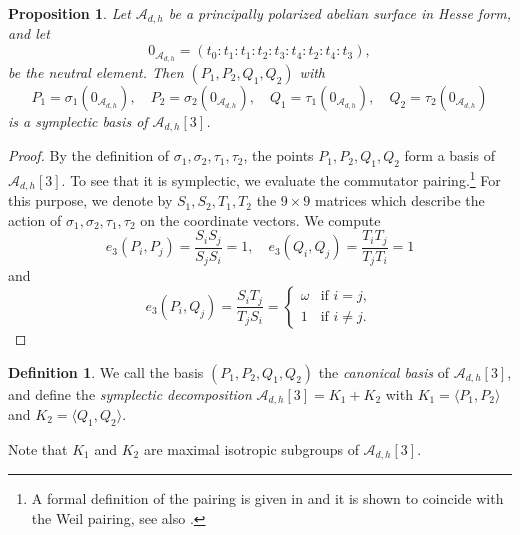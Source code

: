 \documentclass[11pt]{amsart}
\newtheorem{proposition}[theorem]{Proposition}
\theoremstyle{definition}
\newtheorem{definition}[theorem]{Definition}
\newcommand{\A}{\mathcal{A}}
\begin{document}
\begin{proposition} \label{prop:3-torsion}
	Let $\A_{d,h}$ be a principally polarized abelian surface in Hesse form, and let
    \[
    0_{\A_{d,h}} = (t_0 : t_1 : t_1 : t_2 : t_3: t_4 : t_2 : t_4 : t_3),
    \] be the neutral element. Then $(P_1,P_2,Q_1,Q_2)$ with
    \[
    P_1 = \sigma_1(0_{\A_{d,h}}),\quad P_2 = \sigma_2(0_{\A_{d,h}}), \quad Q_1 = \tau_1(0_{\A_{d,h}}),\quad Q_2 = \tau_2(0_{\A_{d,h}})
    \]
	is a symplectic basis of $\A_{d,h}[3]$. 
\end{proposition}

\begin{proof}
	By the definition of $\sigma_1,\sigma_2,\tau_1,\tau_2$, the points $P_1,P_2,Q_1,Q_2$ form a basis of  $\A_{d,h}[3]$.  To see that it is  symplectic, we evaluate the commutator pairing.\footnote{A formal definition of the pairing is given in \cite[p.227]{mumford-book} and it is shown to coincide with the Weil pairing, see also \cite[Section 6.1]{lubicz2012computing}.} For this purpose, we denote by $S_1,S_2,T_1,T_2$ the $9\times 9$ matrices which describe the action of $\sigma_1,\sigma_2,\tau_1,\tau_2$ on the coordinate vectors. We compute
	\[
	e_3(P_i,P_j) = \frac{S_iS_j}{S_jS_i} = 1, \quad e_3(Q_i,Q_j) = \frac{T_iT_j}{T_jT_i} = 1
	\]
	and 
	\[
	e_3(P_i, Q_j) = \frac{S_iT_j}{T_jS_i} = \begin{cases}
		\omega & \text{if } i = j,\\
		1 & \text{if } i\neq j.
	\end{cases}
	\]
\end{proof}

\begin{definition} \label{def:symplectic-decomposition}
	We call the basis $(P_1,P_2,Q_1,Q_2)$ the {\em canonical basis} of $\A_{d,h}[3]$, and define the {\em symplectic decomposition} $\A_{d,h}[3] = K_1 + K_2$ with $K_1 = \langle P_1, P_2 \rangle$ and $K_2 = \langle Q_1,Q_2 \rangle$.
\end{definition}
Note that $K_1$ and $K_2$ are maximal isotropic subgroups of $\A_{d,h}[3]$.
\end{document}
